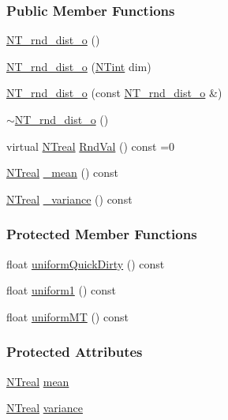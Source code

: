 \subsubsection*{Public Member Functions}
\begin{DoxyCompactItemize}
\item 
\hyperlink{class_n_t__rnd__dist__o_af044f0599a8dea08547b8a3cd1481248}{NT\_\-rnd\_\-dist\_\-o} ()
\item 
\hyperlink{class_n_t__rnd__dist__o_a713ac222b9a6e9bab56db2c4161848b9}{NT\_\-rnd\_\-dist\_\-o} (\hyperlink{nt__types_8h_aee8aa0a9869e8b5c97c6c02217ff09cd}{NTint} dim)
\item 
\hyperlink{class_n_t__rnd__dist__o_a5a616c20ee014a1838ea64a5b816f6c1}{NT\_\-rnd\_\-dist\_\-o} (const \hyperlink{class_n_t__rnd__dist__o}{NT\_\-rnd\_\-dist\_\-o} \&)
\item 
\hyperlink{class_n_t__rnd__dist__o_ae04e04c97d542ad1a2cc409ce3df0cfd}{$\sim$NT\_\-rnd\_\-dist\_\-o} ()
\item 
virtual \hyperlink{nt__types_8h_a814a97893e9deb1eedcc7604529ba80d}{NTreal} \hyperlink{class_n_t__rnd__dist__o_a46234bbd8bd9e2ce5ae0fa7c2065531c}{RndVal} () const =0
\item 
\hyperlink{nt__types_8h_a814a97893e9deb1eedcc7604529ba80d}{NTreal} \hyperlink{class_n_t__rnd__dist__o_ad4ad87c5f5ccdd56e46da7d5f0653866}{\_\-mean} () const 
\item 
\hyperlink{nt__types_8h_a814a97893e9deb1eedcc7604529ba80d}{NTreal} \hyperlink{class_n_t__rnd__dist__o_a72ad9cef4f69ba1a160b818999c18b36}{\_\-variance} () const 
\end{DoxyCompactItemize}
\subsubsection*{Protected Member Functions}
\begin{DoxyCompactItemize}
\item 
float \hyperlink{class_n_t__rnd__dist__o_ae68323c8b4f103b2408b886c0eef7040}{uniformQuickDirty} () const 
\item 
float \hyperlink{class_n_t__rnd__dist__o_a5d476650bcde7d3c50df24e0b1a84593}{uniform1} () const 
\item 
float \hyperlink{class_n_t__rnd__dist__o_affbf120c41565798014416055a5dc126}{uniformMT} () const 
\end{DoxyCompactItemize}
\subsubsection*{Protected Attributes}
\begin{DoxyCompactItemize}
\item 
\hyperlink{nt__types_8h_a814a97893e9deb1eedcc7604529ba80d}{NTreal} \hyperlink{class_n_t__rnd__dist__o_a8c784d5820df6cfabdb2ba173e996443}{mean}
\item 
\hyperlink{nt__types_8h_a814a97893e9deb1eedcc7604529ba80d}{NTreal} \hyperlink{class_n_t__rnd__dist__o_a1ecdd5828c60e24ba685a617eda91de1}{variance}
\end{DoxyCompactItemize}
